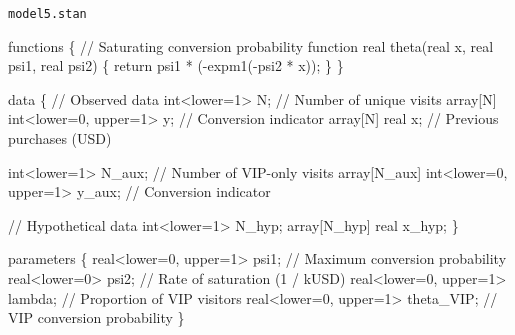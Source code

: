 \documentclass[
  letterpaper,
  DIV=11,
  numbers=noendperiod]{scrartcl}
\newenvironment{Shaded}{\begin{snugshade}}{\end{snugshade}}
\newcommand{\CommentTok}[1]{\textcolor[rgb]{0.37,0.37,0.37}{#1}}
\newcommand{\ControlFlowTok}[1]{\textcolor[rgb]{0.00,0.23,0.31}{#1}}
\newcommand{\DataTypeTok}[1]{\textcolor[rgb]{0.68,0.00,0.00}{#1}}
\newcommand{\DecValTok}[1]{\textcolor[rgb]{0.68,0.00,0.00}{#1}}
\newcommand{\KeywordTok}[1]{\textcolor[rgb]{0.00,0.23,0.31}{#1}}
\newcommand{\NormalTok}[1]{\textcolor[rgb]{0.00,0.23,0.31}{#1}}
\begin{document}
\begin{codelisting}

\caption{\texttt{model5.stan}}

\begin{Shaded}
\begin{Highlighting}[]
\KeywordTok{functions}\NormalTok{ \{}
  \CommentTok{// Saturating conversion probability function}
  \DataTypeTok{real}\NormalTok{ theta(}\DataTypeTok{real}\NormalTok{ x, }\DataTypeTok{real}\NormalTok{ psi1, }\DataTypeTok{real}\NormalTok{ psi2) \{}
    \ControlFlowTok{return}\NormalTok{ psi1 * ({-}expm1({-}psi2 * x));}
\NormalTok{  \}}
\NormalTok{\}}

\KeywordTok{data}\NormalTok{ \{}
  \CommentTok{// Observed data}
  \DataTypeTok{int}\NormalTok{\textless{}}\KeywordTok{lower}\NormalTok{=}\DecValTok{1}\NormalTok{\textgreater{} N;                    }\CommentTok{// Number of unique visits}
  \DataTypeTok{array}\NormalTok{[N] }\DataTypeTok{int}\NormalTok{\textless{}}\KeywordTok{lower}\NormalTok{=}\DecValTok{0}\NormalTok{, }\KeywordTok{upper}\NormalTok{=}\DecValTok{1}\NormalTok{\textgreater{} y;  }\CommentTok{// Conversion indicator}
  \DataTypeTok{array}\NormalTok{[N] }\DataTypeTok{real}\NormalTok{ x;                   }\CommentTok{// Previous purchases (USD)}

  \DataTypeTok{int}\NormalTok{\textless{}}\KeywordTok{lower}\NormalTok{=}\DecValTok{1}\NormalTok{\textgreater{} N\_aux;                       }\CommentTok{// Number of VIP{-}only visits}
  \DataTypeTok{array}\NormalTok{[N\_aux] }\DataTypeTok{int}\NormalTok{\textless{}}\KeywordTok{lower}\NormalTok{=}\DecValTok{0}\NormalTok{, }\KeywordTok{upper}\NormalTok{=}\DecValTok{1}\NormalTok{\textgreater{} y\_aux; }\CommentTok{// Conversion indicator}

  \CommentTok{// Hypothetical data}
  \DataTypeTok{int}\NormalTok{\textless{}}\KeywordTok{lower}\NormalTok{=}\DecValTok{1}\NormalTok{\textgreater{} N\_hyp;}
  \DataTypeTok{array}\NormalTok{[N\_hyp] }\DataTypeTok{real}\NormalTok{ x\_hyp;}
\NormalTok{\}}

\KeywordTok{parameters}\NormalTok{ \{}
  \DataTypeTok{real}\NormalTok{\textless{}}\KeywordTok{lower}\NormalTok{=}\DecValTok{0}\NormalTok{, }\KeywordTok{upper}\NormalTok{=}\DecValTok{1}\NormalTok{\textgreater{} psi1;      }\CommentTok{// Maximum conversion probability}
  \DataTypeTok{real}\NormalTok{\textless{}}\KeywordTok{lower}\NormalTok{=}\DecValTok{0}\NormalTok{\textgreater{} psi2;               }\CommentTok{// Rate of saturation (1 / kUSD)}
  \DataTypeTok{real}\NormalTok{\textless{}}\KeywordTok{lower}\NormalTok{=}\DecValTok{0}\NormalTok{, }\KeywordTok{upper}\NormalTok{=}\DecValTok{1}\NormalTok{\textgreater{} lambda;    }\CommentTok{// Proportion of VIP visitors}
  \DataTypeTok{real}\NormalTok{\textless{}}\KeywordTok{lower}\NormalTok{=}\DecValTok{0}\NormalTok{, }\KeywordTok{upper}\NormalTok{=}\DecValTok{1}\NormalTok{\textgreater{} theta\_VIP; }\CommentTok{// VIP conversion probability}
\NormalTok{\}}


\end{Highlighting}
\end{Shaded}
\end{codelisting}
\end{document}
